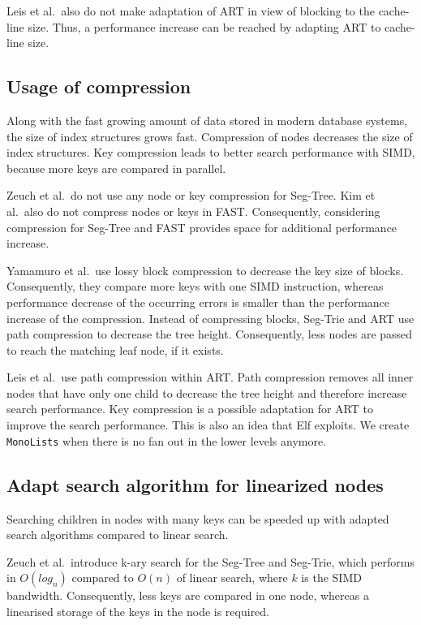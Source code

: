 \documentclass[runningheads,a4paper]{llncs}
\begin{document}
Leis et al.\ also do not make adaptation of ART in view of blocking to the cache-line size. Thus, a performance increase can be reached by adapting ART to cache-line size.


\subsection{Usage of compression}
Along with the fast growing amount of data stored in modern database systems, the size of index structures grows fast. Compression of nodes decreases the size of index structures. Key compression leads to better search performance with SIMD, because more keys are compared in parallel.

Zeuch et al.\ do not use any node or key compression for Seg-Tree. Kim et al.\ also do not compress nodes or keys in FAST. Consequently, considering compression for Seg-Tree and FAST provides space for additional performance increase.

Yamamuro et al.\ use lossy block compression to decrease the key size of blocks. Consequently, they compare more keys with one SIMD instruction, whereas performance decrease of the occurring errors is smaller than the performance increase of the compression. Instead of compressing blocks, Seg-Trie and ART use path compression to decrease the tree height. Consequently, less nodes are passed to reach the matching leaf node, if it exists.

Leis et al.\ use path compression within ART. Path compression removes all inner nodes that have only one child to decrease the tree height and therefore increase search performance. Key compression is a possible adaptation for ART to improve the search performance. This is also an idea that Elf exploits. We create \verb.MonoLists. when there is no fan out in the lower levels anymore.

\subsection{Adapt search algorithm for linearized nodes}
Searching children in nodes with many keys can be speeded up with adapted search algorithms compared to linear search.

Zeuch et al.\ introduce k-ary search for the Seg-Tree and Seg-Trie, which performs in $O(log_n)$ compared to $O(n)$ of linear search, where $k$ is the SIMD bandwidth. Consequently, less keys are compared in one node, whereas a linearised storage of the keys in the node is required. 
\end{document}
